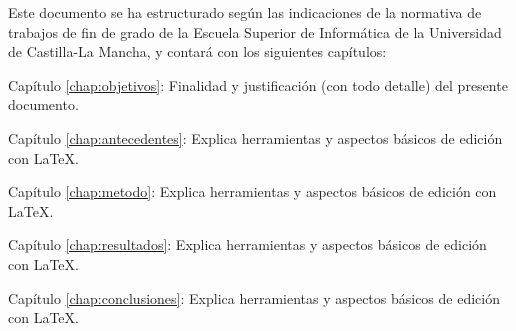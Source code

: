   Este documento se ha estructurado según las indicaciones de la normativa de trabajos de fin de grado de la Escuela Superior de Informática de la Universidad de Castilla-La Mancha, y contará con  los siguientes capítulos:
  \begin{definitionlist}
  \item[Capítulo \ref{chap:objetivos}: \nameref{chap:objetivos}] Finalidad y justificación  (con todo detalle) del presente documento.
  \item[Capítulo \ref{chap:antecedentes}: \nameref{chap:antecedentes}] Explica herramientas y aspectos básicos de edición con \LaTeX.
  \item[Capítulo \ref{chap:metodo}: \nameref{chap:metodo}] Explica herramientas y aspectos básicos de edición con \LaTeX.
  \item[Capítulo \ref{chap:resultados}: \nameref{chap:resultados}] Explica herramientas y aspectos básicos de edición con \LaTeX.
  \item[Capítulo \ref{chap:conclusiones}: \nameref{chap:conclusiones}] Explica herramientas y aspectos básicos de edición con \LaTeX.
  \end{definitionlist}



